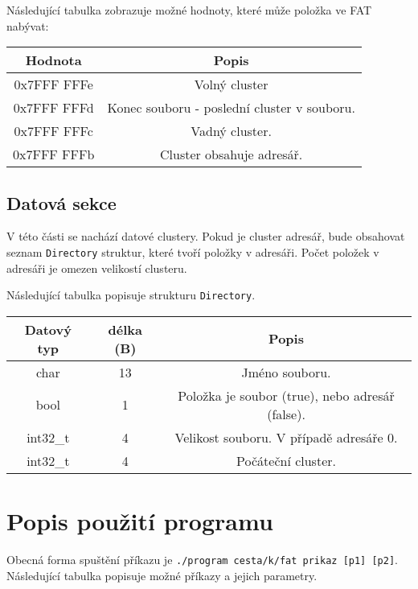\documentclass[11pt,a4paper]{scrartcl}
\begin{document}
	Následující tabulka zobrazuje možné hodnoty, které může položka ve FAT nabývat:
	
	\begin{center}
		\begin{tabular}{|c|c|}
			\hline
			Hodnota & Popis \\
			\hline
			0x7FFF FFFe & Volný cluster \\
			0x7FFF FFFd & Konec souboru - poslední cluster v souboru. \\
			0x7FFF FFFc & Vadný cluster. \\
			0x7FFF FFFb & Cluster obsahuje adresář. \\
			\hline
		\end{tabular}
	\end{center}
	
	\subsection{Datová sekce}
	V této části se nachází datové clustery. Pokud je cluster adresář, bude obsahovat seznam \verb|Directory| struktur, které tvoří položky v adresáři. Počet položek v adresáři je omezen velikostí clusteru.
	
	Následující tabulka popisuje strukturu \verb|Directory|.
	
	\begin{center}
		\begin{tabular}{|c|c|c|}
			\hline
			Datový typ & délka (B) & Popis \\
			\hline
			char & 13 & Jméno souboru. \\
			bool & 1 & Položka je soubor (true), nebo adresář (false). \\
			int32\_t & 4 & Velikost souboru. V případě adresáře 0. \\
			int32\_t & 4 & Počáteční cluster. \\
			\hline
		\end{tabular}
	\end{center}

	\section{Popis použití programu}
	Obecná forma spuštění příkazu je \verb|./program cesta/k/fat prikaz [p1] [p2]|.
	Následující tabulka popisuje možné příkazy a jejich parametry.
	
\end{document}
